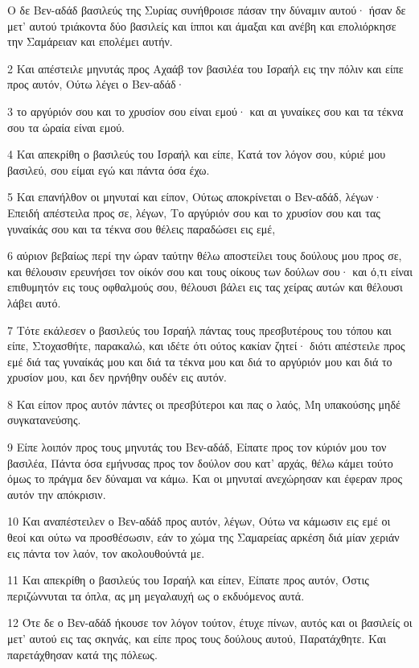 \par Ο δε Βεν-αδάδ βασιλεύς της Συρίας συνήθροισε πάσαν την δύναμιν αυτού· ήσαν δε μετ' αυτού τριάκοντα δύο βασιλείς και ίπποι και άμαξαι και ανέβη και επολιόρκησε την Σαμάρειαν και επολέμει αυτήν.
\par 2 Και απέστειλε μηνυτάς προς Αχαάβ τον βασιλέα του Ισραήλ εις την πόλιν και είπε προς αυτόν, Ούτω λέγει ο Βεν-αδάδ·
\par 3 το αργύριόν σου και το χρυσίον σου είναι εμού· και αι γυναίκες σου και τα τέκνα σου τα ώραία είναι εμού.
\par 4 Και απεκρίθη ο βασιλεύς του Ισραήλ και είπε, Κατά τον λόγον σου, κύριέ μου βασιλεύ, σου είμαι εγώ και πάντα όσα έχω.
\par 5 Και επανήλθον οι μηνυταί και είπον, Ούτως αποκρίνεται ο Βεν-αδάδ, λέγων· Επειδή απέστειλα προς σε, λέγων, Το αργύριόν σου και το χρυσίον σου και τας γυναίκάς σου και τα τέκνα σου θέλεις παραδώσει εις εμέ,
\par 6 αύριον βεβαίως περί την ώραν ταύτην θέλω αποστείλει τους δούλους μου προς σε, και θέλουσιν ερευνήσει τον οίκόν σου και τους οίκους των δούλων σου· και ό,τι είναι επιθυμητόν εις τους οφθαλμούς σου, θέλουσι βάλει εις τας χείρας αυτών και θέλουσι λάβει αυτό.
\par 7 Τότε εκάλεσεν ο βασιλεύς του Ισραήλ πάντας τους πρεσβυτέρους του τόπου και είπε, Στοχασθήτε, παρακαλώ, και ιδέτε ότι ούτος κακίαν ζητεί· διότι απέστειλε προς εμέ διά τας γυναίκάς μου και διά τα τέκνα μου και διά το αργύριόν μου και διά το χρυσίον μου, και δεν ηρνήθην ουδέν εις αυτόν.
\par 8 Και είπον προς αυτόν πάντες οι πρεσβύτεροι και πας ο λαός, Μη υπακούσης μηδέ συγκατανεύσης.
\par 9 Είπε λοιπόν προς τους μηνυτάς του Βεν-αδάδ, Είπατε προς τον κύριόν μου τον βασιλέα, Πάντα όσα εμήνυσας προς τον δούλον σου κατ' αρχάς, θέλω κάμει τούτο όμως το πράγμα δεν δύναμαι να κάμω. Και οι μηνυταί ανεχώρησαν και έφεραν προς αυτόν την απόκρισιν.
\par 10 Και αναπέστειλεν ο Βεν-αδάδ προς αυτόν, λέγων, Ούτω να κάμωσιν εις εμέ οι θεοί και ούτω να προσθέσωσιν, εάν το χώμα της Σαμαρείας αρκέση διά μίαν χεριάν εις πάντα τον λαόν, τον ακολουθούντά με.
\par 11 Και απεκρίθη ο βασιλεύς του Ισραήλ και είπεν, Είπατε προς αυτόν, Όστις περιζώννυται τα όπλα, ας μη μεγαλαυχή ως ο εκδυόμενος αυτά.
\par 12 Ότε δε ο Βεν-αδάδ ήκουσε τον λόγον τούτον, έτυχε πίνων, αυτός και οι βασιλείς οι μετ' αυτού εις τας σκηνάς, και είπε προς τους δούλους αυτού, Παρατάχθητε. Και παρετάχθησαν κατά της πόλεως.
